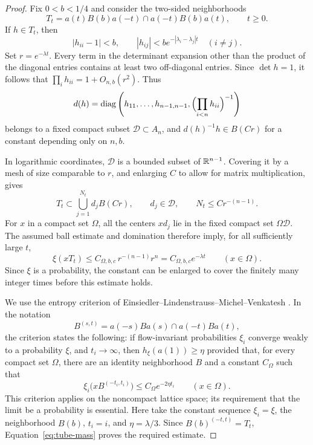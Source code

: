 \begin{proof}
Fix $0<b<1/4$ and consider the two-sided neighborhoods
\[
 T_t=a(t)B(b)a(-t)\cap a(-t)B(b)a(t),\qquad t\ge0.
\]
If $h\in T_t$, then
\begin{equation}\label{eq:tube-entries}
 |h_{ii}-1|<b,\qquad
 |h_{ij}|<b e^{-|\lambda_i-\lambda_j|t}\quad(i\ne j).
\end{equation}
Set $r=e^{-\lambda t}$.  Every term in the determinant expansion other
than the product of the diagonal entries contains at least two
off-diagonal entries.  Since $\det h=1$, it follows that
$\prod_i h_{ii}=1+O_{n,b}(r^2)$.  Thus
\[
 d(h)=\operatorname{diag}\left(h_{11},\ldots,h_{n-1,n-1},
                   \Bigl(\prod_{i<n}h_{ii}\Bigr)^{-1}\right)
\]
belongs to a fixed compact subset $\mathcal D\subset A_n$, and
$d(h)^{-1}h\in B(Cr)$ for a constant depending only on $n,b$.

In logarithmic coordinates, $\mathcal D$ is a bounded subset of $\mathbb R^{n-1}$.
Covering it by a mesh of size comparable to $r$, and enlarging $C$ to
allow for matrix multiplication, gives
\begin{equation}\label{eq:tube-cover}
 T_t\subset\bigcup_{j=1}^{N_t}d_jB(Cr),
 \qquad d_j\in\mathcal D,\qquad N_t\le Cr^{-(n-1)}.
\end{equation}
For $x$ in a compact set $\Omega$, all the centers $xd_j$ lie in the
fixed compact set $\Omega\mathcal D$.  The assumed ball estimate and domination
therefore imply, for all sufficiently large $t$,
\begin{equation}\label{eq:tube-mass}
 \xi(xT_t)\le C_{\Omega,b,c}\,r^{-(n-1)}r^n
             =C_{\Omega,b,c}e^{-\lambda t}
 \qquad(x\in\Omega).
\end{equation}
Since $\xi$ is a probability, the constant can be enlarged to cover
the finitely many integer times before this estimate holds.

We use the entropy criterion of
Einsiedler--Lindenstrauss--Michel--Venkatesh
\cite[Corollary~3.3]{ELMV2009}.  In the notation
\[
 B^{(s,t)}=a(-s)Ba(s)\cap a(-t)Ba(t),
\]
the criterion states the following: if flow-invariant probabilities
$\xi_i$ converge weakly to a probability $\xi$, and $t_i\to\infty$,
then $h_\xi(a(1))\ge\eta$ provided that, for every compact set $\Omega$,
there are an identity neighborhood $B$ and a constant $C_\Omega$ such that
\[
 \xi_i\bigl(xB^{(-t_i,t_i)}\bigr)
       \le C_\Omega e^{-2\eta t_i}\qquad(x\in\Omega).
\]
This criterion applies on the noncompact lattice space; its requirement
that the limit be a probability is essential.  Here take the constant
sequence $\xi_i=\xi$, the neighborhood $B(b)$, $t_i=i$, and
$\eta=\lambda/3$.  Since $B(b)^{(-t,t)}=T_t$,
Equation~\eqref{eq:tube-mass} proves the required estimate.
\end{proof}

